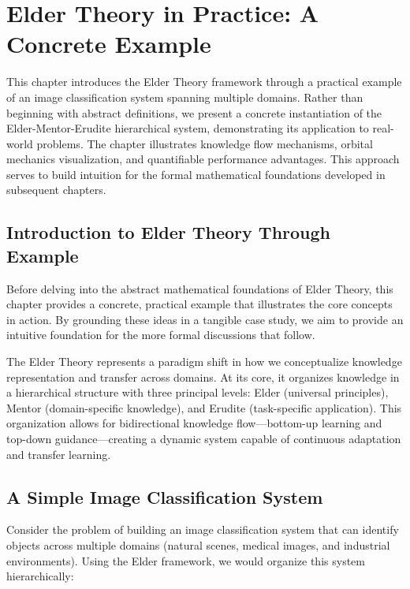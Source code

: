 \chapter{Elder Theory in Practice: A Concrete Example}

\begin{tcolorbox}[colback=PureBlue!5!white,colframe=PureBlue!75!black,title=Chapter Summary]
This chapter introduces the Elder Theory framework through a practical example of an image classification system spanning multiple domains. Rather than beginning with abstract definitions, we present a concrete instantiation of the Elder-Mentor-Erudite hierarchical system, demonstrating its application to real-world problems. The chapter illustrates knowledge flow mechanisms, orbital mechanics visualization, and quantifiable performance advantages. This approach serves to build intuition for the formal mathematical foundations developed in subsequent chapters.
\end{tcolorbox}

\section{Introduction to Elder Theory Through Example}

Before delving into the abstract mathematical foundations of Elder Theory, this chapter provides a concrete, practical example that illustrates the core concepts in action. By grounding these ideas in a tangible case study, we aim to provide an intuitive foundation for the more formal discussions that follow.

The Elder Theory represents a paradigm shift in how we conceptualize knowledge representation and transfer across domains. At its core, it organizes knowledge in a hierarchical structure with three principal levels: Elder (universal principles), Mentor (domain-specific knowledge), and Erudite (task-specific application). This organization allows for bidirectional knowledge flow—bottom-up learning and top-down guidance—creating a dynamic system capable of continuous adaptation and transfer learning.

\section{A Simple Image Classification System}

Consider the problem of building an image classification system that can identify objects across multiple domains (natural scenes, medical images, and industrial environments). Using the Elder framework, we would organize this system hierarchically:

